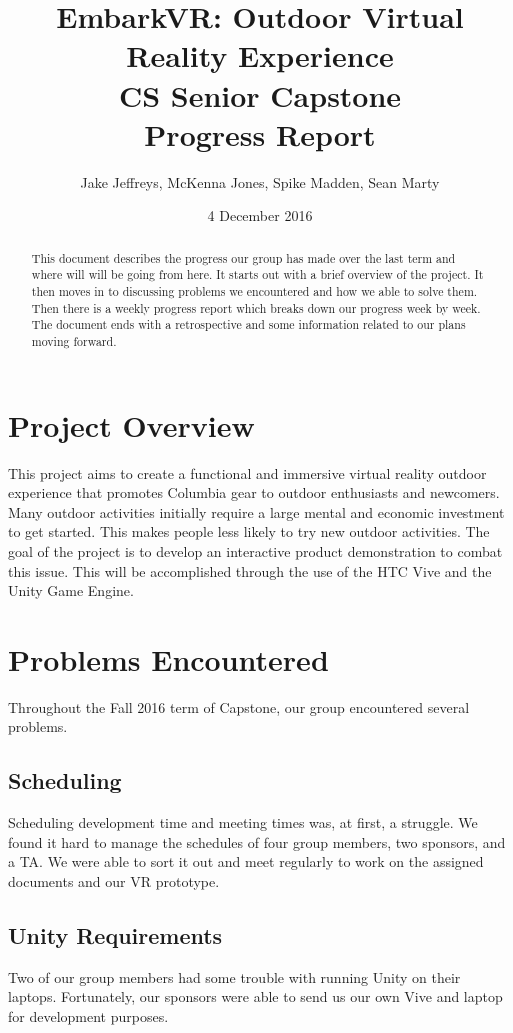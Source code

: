 \documentclass[10pt,journal,compsoc,onecolumn, draftclsnofoot]{IEEEtran}
\title{
EmbarkVR: Outdoor Virtual Reality Experience \\
CS Senior Capstone \\
Progress Report\\
\vspace{1mm}
}
\author{Jake Jeffreys, McKenna Jones, Spike Madden, Sean Marty}
\date{4 December 2016}
\begin{document}
\begin{titlepage}
\maketitle
\vspace{1mm}
\begin{abstract}
This document describes the progress our group has made over the last term and where will will be going from here. It starts out with a brief overview of the project. It then moves in to discussing problems we encountered and how we able to solve them. Then there is a weekly progress report which breaks down our progress week by week. The document ends with a retrospective and some information related to our plans moving forward. 
\end{abstract}
\vspace{1cm}
\end{titlepage}
\tableofcontents
\clearpage

\section{Project Overview}
This project aims to create a functional and immersive virtual reality outdoor experience that promotes Columbia gear to outdoor enthusiasts and newcomers.
Many outdoor activities initially require a large mental and economic
investment to get started.
This makes people less likely to try new outdoor activities.
The goal of the project is to develop an interactive product demonstration to combat this issue.
This will be accomplished through the use of the HTC Vive and the Unity Game Engine.


\section{Problems Encountered}
Throughout the Fall 2016 term of Capstone, our group encountered several problems.
\subsection{Scheduling}
Scheduling development time and meeting times was, at first, a struggle.
We found it hard to manage the schedules of four group members, two sponsors, and a TA.
We were able to sort it out and meet regularly to work on the assigned documents and our VR prototype.
\subsection{Unity Requirements}
Two of our group members had some trouble with running Unity on their laptops.
Fortunately, our sponsors were able to send us our own Vive and laptop for development purposes.
\end{document}
